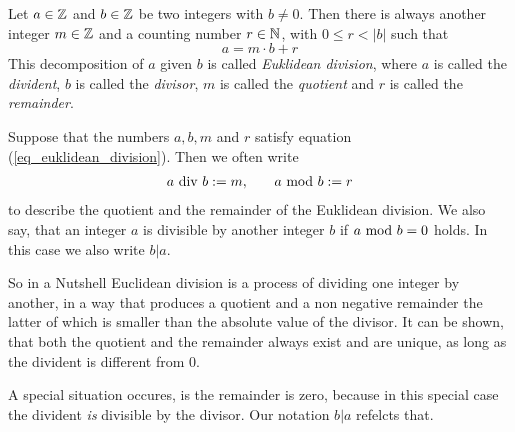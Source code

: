 Let $ a \in \mathbb{Z} $ and $ b \in \mathbb{Z} $ be two integers with $b\neq 0$. Then there is always another integer $ m \in \mathbb{Z} $ and a counting number $ r \in \mathbb{N} $, with $ 0 \leq r <|b| $ such that
\begin{equation}
\label{eq_euklidean_division}
a = m \cdot b + r
\end{equation}
This decomposition of $a$ given $b$ is called \textit{Euklidean division}, where $ a $ is called the \textit{divident}, $ b $ is called the \textit{divisor}, $m$ is called the \textit{quotient} and $r$ is called the \textit{remainder}. 
\begin{notation}
\label{eq_euklidean_division_notation}
Suppose that the numbers $ a, b, m $ and $ r $ satisfy equation (\ref{eq_euklidean_division}). Then we often write 
\begin{equation}
\label{def_integer_division_and_modulus}
\begin{array}{lcr}
a \text{ div } b: = m, & & a \text{ mod } b: = r 
\end{array}
\end{equation}
to describe the quotient and the remainder of the Euklidean division. We also say, that an integer $ a $ is divisible by another integer $ b $ if $ a \text{ mod } b = 0 $ holds. In this case we also write $ b | a $.
\end{notation}
So in a Nutshell Euclidean division is a process of dividing one integer by another, in a way that produces a quotient and a non negative remainder the latter of which is smaller than the absolute value of the divisor. It can be shown, that both the quotient and the remainder always exist and are unique, as long as the divident is different from $0$.

A special situation occures, is the remainder is zero, because in this special case the divident \textit{is} divisible by the divisor. Our notation $b | a$ refelcts that. 


